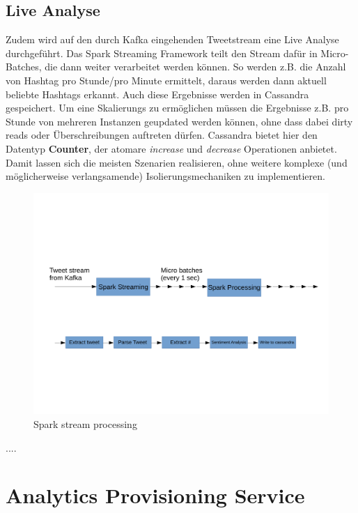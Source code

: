 \subsection*{Live Analyse}
Zudem wird auf den durch Kafka eingehenden Tweetstream eine Live Analyse durchgeführt.
Das Spark Streaming Framework teilt den Stream dafür in Micro-Batches, die dann weiter verarbeitet werden können.
So werden z.B. die Anzahl von Hashtag pro Stunde/pro Minute ermittelt, daraus werden dann aktuell beliebte Hashtags erkannt.
Auch diese Ergebnisse werden in Cassandra gespeichert.
Um eine Skalierungs zu ermöglichen müssen die Ergebnisse z.B. pro Stunde von mehreren Instanzen geupdated werden können, ohne dass dabei dirty reads oder Überschreibungen auftreten dürfen. Cassandra bietet hier den Datentyp \textbf{Counter}, der atomare \textit{increase} und \textit{decrease} Operationen anbietet. Damit lassen sich die meisten Szenarien realisieren, ohne weitere  komplexe (und möglicherweise verlangsamende) Isolierungsmechaniken zu implementieren.
\begin{figure}[htbp!]
\centering
\includegraphics[width=\linewidth]{pics/analytics/streamProcessing.pdf}
\caption{Spark stream processing}
\label{fig:streamProcessing}
\end{figure}

....



\section{Analytics Provisioning Service}

